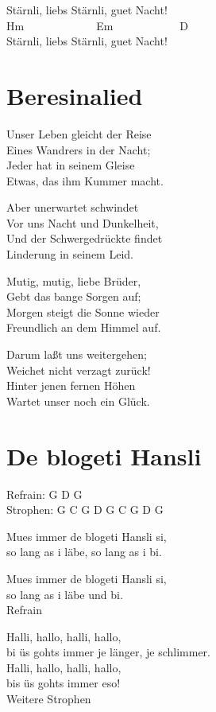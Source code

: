 \documentclass[
  letterpaper,
  a5paper]{memoir}
\begin{document}
Stärnli, liebs Stärnli, guet Nacht!\\
Hm~~~~~~~~~~~~~Em~~~~~~~~~~~~D\\
Stärnli, liebs Stärnli, guet Nacht!

\hypertarget{beresinalied}{%
\chapter{Beresinalied}\label{beresinalied}}

Unser Leben gleicht der Reise\\
Eines Wandrers in der Nacht;\\
Jeder hat in seinem Gleise\\
Etwas, das ihm Kummer macht.

Aber unerwartet schwindet\\
Vor uns Nacht und Dunkelheit,\\
Und der Schwergedrückte findet\\
Linderung in seinem Leid.

Mutig, mutig, liebe Brüder,\\
Gebt das bange Sorgen auf;\\
Morgen steigt die Sonne wieder\\
Freundlich an dem Himmel auf.

Darum laßt uns weitergehen;\\
Weichet nicht verzagt zurück!\\
Hinter jenen fernen Höhen\\
Wartet unser noch ein Glück.

\hypertarget{de-blogeti-hansli}{%
\chapter{De blogeti Hansli}\label{de-blogeti-hansli}}

Refrain: G D G\\
Strophen: G C G D G C G D G

Mues immer de blogeti Hansli si,\\
so lang as i läbe, so lang as i bi.

Mues immer de blogeti Hansli si,\\
so lang as i läbe und bi.\\
Refrain

Halli, hallo, halli, hallo,\\
bi üs gohts immer je länger, je schlimmer.\\
Halli, hallo, halli, hallo,\\
bis üs gohts immer eso!\\
Weitere Strophen
\end{document}
